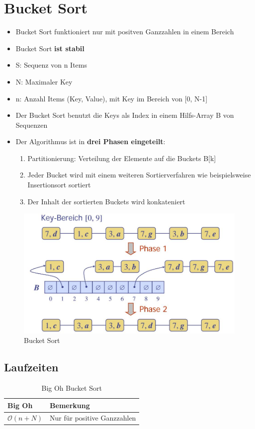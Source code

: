 \section{Bucket Sort}
\begin{itemize}
	\item Bucket Sort funktioniert nur mit positven Ganzzahlen in einem Bereich
	\item Bucket Sort \textbf{ist stabil}
	\item S: Sequenz von n Items
	\item N: Maximaler Key
	\item n: Anzahl Items (Key, Value), mit Key im Bereich von [0, N-1]
	\item Der Bucket Sort benutzt die Keys als Index in einem Hilfs-Array B von Sequenzen
	\item Der Algorithmus ist in \textbf{drei Phasen eingeteilt}:
	\begin{enumerate}
		\item Partitionierung: Verteilung der Elemente auf die Buckets B[k]
		\item Jeder Bucket wird mit einem weiteren Sortierverfahren wie beispielsweise Insertionsort sortiert
		\item Der Inhalt der sortierten Buckets wird konkateniert
	\end{enumerate}
\end{itemize}

\begin{figure}[h]
\centering
\includegraphics[width=0.8\linewidth]{images/bucketsort}
\caption{Bucket Sort}
\label{fig:bucketsort}
\end{figure}


\subsection{Laufzeiten}
\begin{table}[h]
	\centering
	\begin{tabu} to \linewidth {l l}
		\toprule
		Big Oh & Bemerkung \\
		\midrule
		$\mathcal{O}(n + N)$ & Nur für positive Ganzzahlen \\
		\bottomrule
	\end{tabu}
	\caption{Big Oh Bucket Sort}
\end{table}

